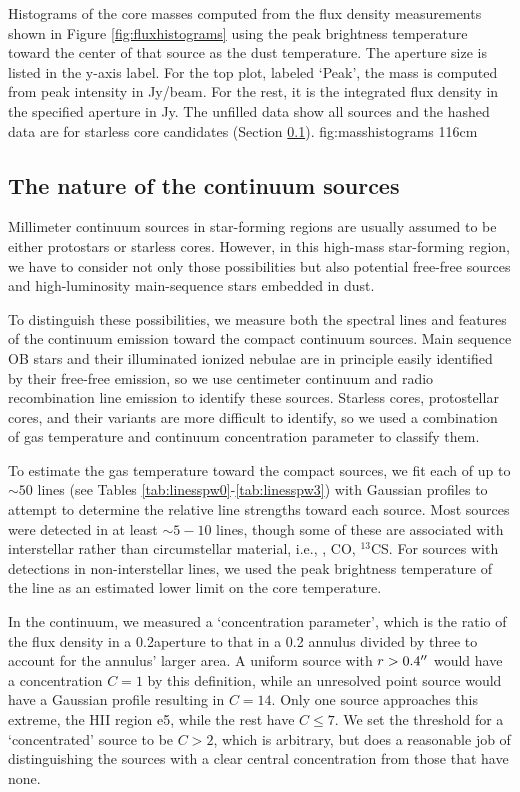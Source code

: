 \documentclass[twocolumn]{aastex61}
\begin{document}
{Histograms of the core masses computed from the flux density measurements
shown in Figure \ref{fig:fluxhistograms} using the peak brightness temperature 
toward the center of that source as the dust temperature.
The aperture size is listed in the y-axis label.  For the top plot, labeled
`Peak', the mass is computed from peak
intensity in Jy/beam.  For the rest, it is the integrated flux density in
the specified aperture in Jy.  The unfilled data show all sources and the
hashed
data are for starless core candidates (Section \ref{sec:contsourcenature}).}
{fig:masshistograms}
{1}{16cm}

\subsection{The nature of the continuum sources}
\label{sec:contsourcenature}
Millimeter continuum sources in star-forming regions are usually assumed to be
either protostars or starless cores.  However, in this high-mass star-forming
region, we have to consider not only those possibilities but also potential
free-free sources and high-luminosity main-sequence stars embedded in dust.

To distinguish these possibilities, we measure both the spectral lines and
features of the continuum emission toward the compact continuum sources.  Main
sequence OB stars and their illuminated ionized nebulae are in principle easily
identified by their free-free emission, so we use centimeter continuum and
radio recombination line emission to identify these sources.  Starless cores,
protostellar cores, and their variants are more difficult to identify, so we
used a combination of gas temperature and continuum concentration parameter to
classify them.

To estimate the gas temperature toward the compact sources, we fit each of up
to $\sim50$ lines (see Tables \ref{tab:linesspw0}-\ref{tab:linesspw3}) with
Gaussian profiles to attempt to determine the relative line strengths toward
each source.  Most sources were detected in at least $\sim5-10$ lines, though
some of these are associated with interstellar rather than circumstellar
material, i.e., \formaldehyde, CO, $^{13}$CS.  For sources with detections in
non-interstellar lines, we used the peak brightness temperature of the line as
an estimated lower limit on the core temperature.

In the continuum, we measured a `concentration parameter', which is the ratio
of the flux density in a 0.2\arcsec aperture to that in a 0.2\arcsec
annulus divided by three to account for the annulus' larger area.  A uniform
source with $r>0.4\mbox{$^{\prime\prime}$}$ would have a concentration $C=1$ by this
definition, while an unresolved point source would have a Gaussian profile
resulting in $C=14$.  Only one source approaches this extreme, the HII region
e5, while the rest have $C\leq7$.  We set the threshold for a `concentrated'
source to be $C>2$, which is arbitrary, but does a reasonable job of
distinguishing the sources with a clear central concentration from those that
have none.
\end{document}
